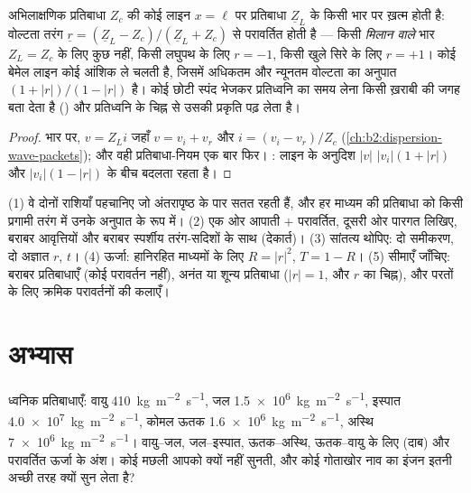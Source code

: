 \begin{proposition}[किसी संचरण लाइन का सिरा]\label{prop:b2:wave-interfaces:coax}
अभिलाक्षणिक प्रतिबाधा $Z_c$ की कोई लाइन $x = \ell$ पर प्रतिबाधा
$\underline Z_L$ के किसी भार पर ख़त्म होती है: वोल्टता तरंग $\underline r =
(\underline Z_L - Z_c)/(\underline Z_L + Z_c)$ से परावर्तित होती है --- किसी \emph{मिलान वाले} भार
$Z_L = Z_c$ के लिए कुछ नहीं, किसी लघुपथ के लिए $r = -1$, किसी खुले सिरे के लिए $r = +1$। कोई
बेमेल लाइन कोई आंशिक  ले चलती है, जिसमें अधिकतम और
न्यूनतम वोल्टता का अनुपात \emph{} $(1 + |r|)/(1 - |r|)$ है।
कोई छोटी स्पंद भेजकर प्रतिध्वनि का समय लेना किसी ख़राबी की जगह बता देता है
() और प्रतिध्वनि के चिह्न से उसकी प्रकृति पढ़ लेता है।
\end{proposition}

\begin{proof}
भार पर, $v = Z_Li$ जहाँ $v = v_i + v_r$ और $i = (v_i - v_r)/Z_c$
(\cref{ch:b2:dispersion-wave-packets}); और वही प्रतिबाधा-नियम एक बार फिर।
: लाइन के अनुदिश $|v|$ $|v_i|(1 + |r|)$ और $|v_i|(1 -
|r|)$ के बीच बदलता रहता है।
\end{proof}

\begin{method}[कोई भी अंतरापृष्ठ]\label{met:b2:wave-interfaces:method}
(1) वे दोनों राशियाँ पहचानिए जो अंतरापृष्ठ के पार सतत रहती हैं, और
हर माध्यम की प्रतिबाधा को किसी प्रगामी तरंग में उनके अनुपात के रूप में।
(2) एक ओर आपाती $+$ परावर्तित, दूसरी ओर पारगत लिखिए,
बराबर आवृत्तियों और बराबर स्पर्शीय तरंग-सदिशों के साथ (देकार्त)।
(3) सांतत्य थोपिए: दो समीकरण, दो अज्ञात $r$, $t$। (4) ऊर्जा:
हानिरहित माध्यमों के लिए $R = |r|^2$, $T = 1 - R$। (5) सीमाएँ जाँचिए: बराबर
प्रतिबाधाएँ (कोई परावर्तन नहीं), अनंत या शून्य प्रतिबाधा ($|r| = 1$, और $r$
का चिह्न), और परतों के लिए क्रमिक परावर्तनों की कलाएँ।
\end{method}

\section{अभ्यास}

\begin{exercise}[$\star$]\label{exo:b2:wave-interfaces:1}
ध्वनिक प्रतिबाधाएँ: वायु \qty{410}{kg.m^{-2}.s^{-1}}, जल \qty{1.5e6}{kg.m^{-2}.s^{-1}},
इस्पात \qty{4.0e7}{kg.m^{-2}.s^{-1}}, कोमल ऊतक \qty{1.6e6}{kg.m^{-2}.s^{-1}}, अस्थि
\qty{7e6}{kg.m^{-2}.s^{-1}}। वायु--जल, जल--इस्पात, ऊतक--अस्थि,
ऊतक--वायु के लिए  (दाब) और परावर्तित ऊर्जा के अंश।
कोई मछली आपको क्यों नहीं सुनती, और कोई गोताखोर नाव का इंजन इतनी
अच्छी तरह क्यों सुन लेता है?
\end{exercise}

